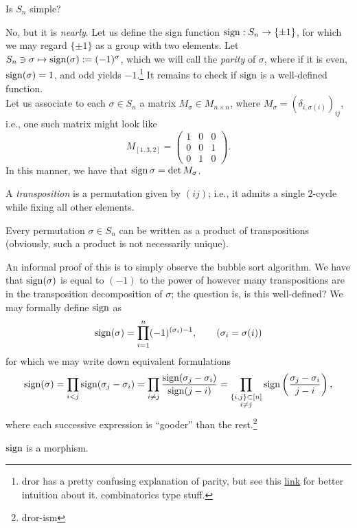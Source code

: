 \begin{example}
    Is $S_n$ simple?
\end{example}
\noindent No, but it is \textit{nearly}. Let us define the sign function $\operatorname{sign} : S_n \to \{\pm 1\}$, for which we may regard $\{\pm 1\}$ as a group with two elements. Let $S_n \ni \sigma \mapsto \operatorname{sign}(\sigma) := (-1)^\sigma$, which we will call the \textit{parity} of $\sigma$, where if it is even, $\operatorname{sign}(\sigma) = 1$, and odd yields $-1$.\footnote{dror has a pretty confusing explanation of parity, but see this \href{https://en.wikipedia.org/wiki/Parity_of_a_permutation}{link} for better intuition about it. combinatorics type stuff.} It remains to check if $\operatorname{sign}$ is a well-defined function.
\\[8pt]
Let us associate to each $\sigma \in S_n$ a matrix $M_\sigma \in M_{n \times n}$, where $M_\sigma = (\delta_{i, \sigma(i)})_{ij}$, i.e., one such matrix might look like
\[ M_{[1, 3, 2]} = \begin{pmatrix} 1 & 0 & 0 \\ 0 & 0 & 1 \\ 0 & 1 & 0 \end{pmatrix}. \]
In this manner, we have that $\operatorname{sign} \sigma = \det M_{\sigma}$.
\begin{definition}
    A \textit{transposition} is a permutation given by $(ij)$; i.e., it admits a single $2$-cycle while fixing all other elements.
\end{definition}
\begin{claim}
    Every permutation $\sigma \in S_n$ can be written as a product of transpositions (obviously, such a product is not necessarily unique).
\end{claim}
\noindent An informal proof of this is to simply observe the bubble sort algorithm. We have that $\operatorname{sign}(\sigma)$ is equal to $(-1)$ to the power of however many transpositions are in the transposition decomposition of $\sigma$; the question is, is this well-defined? We may formally define $\operatorname{sign}$ as
\[ \operatorname{sign}(\sigma) = \prod_{i=1}^n (-1)^{(\sigma_i) - 1}, \tag{$\sigma_i = \sigma(i)$} \]
for which we may write down equivalent formulations
\[ \operatorname{sign}(\sigma) = \prod_{i < j} \operatorname{sign}(\sigma_j - \sigma_i) = \prod_{i \neq j} \frac{\operatorname{sign}(\sigma_j - \sigma_i)}{\operatorname{sign}(j - i)} = \prod_{\substack{\{i, j\} \subset [n] \\ i \neq j}} \operatorname{sign} \left(\frac{\sigma_j - \sigma_i}{j - i}\right), \]
where each successive expression is ``gooder'' than the rest.\footnote{dror-ism}
\begin{theorem}
    $\operatorname{sign}$ is a morphism.
\end{theorem}
